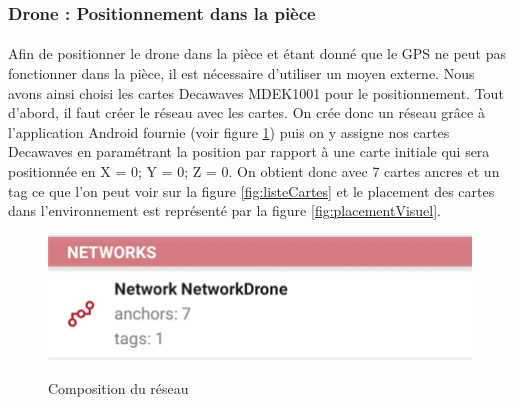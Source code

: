     
    \subsubsection{Drone : Positionnement dans la pièce}
    \label{part:posiDrone}
        \paragraph*{}
        Afin de positionner le drone dans la pièce et étant donné que le GPS ne peut pas fonctionner dans la pièce, il est nécessaire d'utiliser un moyen externe. Nous avons ainsi choisi les cartes Decawaves MDEK1001 pour le positionnement. Tout d'abord, il faut créer le réseau avec les cartes. On crée donc un réseau grâce à l'application Android fournie (voir figure \ref{fig:network}) puis on y assigne nos cartes Decawaves en paramétrant la position par rapport à une carte initiale qui sera positionnée en {X = 0; Y = 0; Z = 0}. On obtient donc avec 7 cartes ancres et un tag ce que l'on peut voir sur la figure \ref{fig:listeCartes} et le placement des cartes dans l'environnement est représenté par la figure \ref{fig:placementVisuel}.
        
        \begin{figure}[H]
            \centering
        	\begin{frame}{\includegraphics[scale=1]{image/UI_Decawave2.png}}
        	\end{frame}
        	\caption{\label{fig:network}Composition du réseau}
        \end{figure}
        
